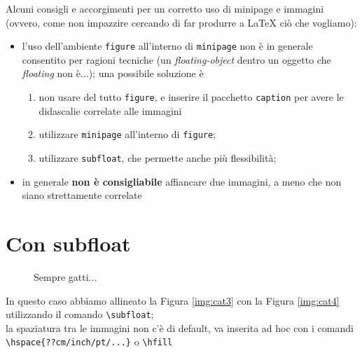 \documentclass{article}
\begin{document}
\vspace{.5cm}
\noindent
Alcuni consigli e accorgimenti per un corretto uso di minipage e immagini (ovvero, come non impazzire cercando di far produrre a LaTeX ciò che vogliamo):
\begin{itemize}
	\item l'uso dell'ambiente \verb|figure| all'interno di \verb|minipage| non è in generale consentito per ragioni tecniche (un \emph{floating-object} dentro un oggetto che \emph{floating} non è...); una possibile soluzione è
	\begin{enumerate}
		\item non usare del tutto \verb|figure|, e inserire il pacchetto \verb|caption| per avere le didascalie correlate alle immagini
		\item utilizzare \verb|minipage| all'interno di \verb|figure|;
		\item utilizzare \verb|subfloat|, che permette anche più flessibilità;
	\end{enumerate}
	\item in generale \textbf{non è consigliabile} affiancare due immagini, a meno che non siano strettamente correlate
\end{itemize}

\section{Con subfloat}
\begin{figure}[h]
	\centering
	\hfill
	\caption{Sempre gatti...}
	\label{steady_state}
\end{figure}
\noindent
In questo caso abbiamo allineato la Figura \ref{img:cat3} con la Figura \ref{img:cat4} utilizzando il comando \verb|\subfloat|;\\ la spaziatura tra le immagini non c'è di default, va inserita ad hoc con i comandi \verb|\hspace{??cm/inch/pt/...}| o \verb|\hfill|
\end{document}
